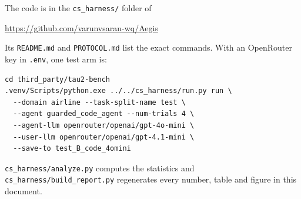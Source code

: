 \documentclass[11pt]{article}
\newcommand{\RepoURL}{https://github.com/varunvsaran-wq/Aegis}
\begin{document}
The code is in the \texttt{cs\_harness/} folder of

\url{\RepoURL}

Its \texttt{README.md} and \texttt{PROTOCOL.md} list the exact commands. With an
OpenRouter key in \texttt{.env}, one test arm is:

\begin{verbatim}
cd third_party/tau2-bench
.venv/Scripts/python.exe ../../cs_harness/run.py run \
  --domain airline --task-split-name test \
  --agent guarded_code_agent --num-trials 4 \
  --agent-llm openrouter/openai/gpt-4o-mini \
  --user-llm openrouter/openai/gpt-4.1-mini \
  --save-to test_B_code_4omini
\end{verbatim}

\texttt{cs\_harness/analyze.py} computes the statistics and
\texttt{cs\_harness/build\_report.py} regenerates every number, table and figure
in this document.
\end{document}

